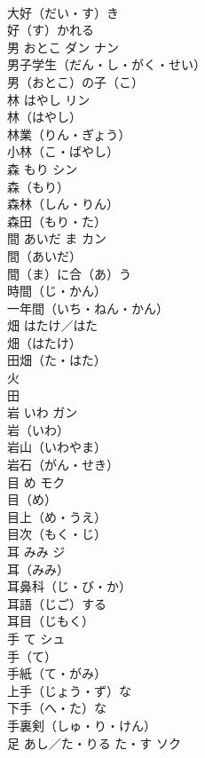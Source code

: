 \documentclass[8pt]{extreport}
\begin{document}
\begin{CJK}{UTF8}{min}
\\	大好（だい・す）き　
\\	好（す）かれる　
\\	男	おとこ	ダン ナン	
\\	男子学生（だん・し・がく・せい）　
\\	男（おとこ）の子（こ）　
\\	林	はやし	リン	
\\	林（はやし）　
\\	林業（りん・ぎょう）　
\\	小林（こ・ばやし）　
\\	森	もり	シン	
\\	森（もり）　
\\	森林（しん・りん）　
\\	森田（もり・た）　
\\	間	あいだ ま	カン	
\\	間（あいだ）　
\\	間（ま）に合（あ）う　
\\	時間（じ・かん）　
\\	一年間（いち・ねん・かん）　
\\	畑	はたけ／はた	
\\	畑（はたけ）　
\\	田畑（た・はた）　
\\	火 
\\	田	
\\	岩	いわ	ガン	
\\	岩（いわ）　
\\	岩山（いわやま）　
\\	岩石（がん・せき）　
\\	目	め	モク	
\\	目（め） 
\\	目上（め・うえ）　
\\	目次（もく・じ）　
\\	耳	みみ	ジ	
\\	耳（みみ）　
\\	耳鼻科（じ・び・か）　
\\	耳語（じご）する　
\\	耳目（じもく） 
\\	手	て	シュ	
\\	手（て）　
\\	手紙（て・がみ）　
\\	上手（じょう・ず）な　
\\	下手（へ・た）な　
\\	手裏剣（しゅ・り・けん）　
\\	足	あし／た・りる た・す	ソク	

\end{CJK}
\end{document}
